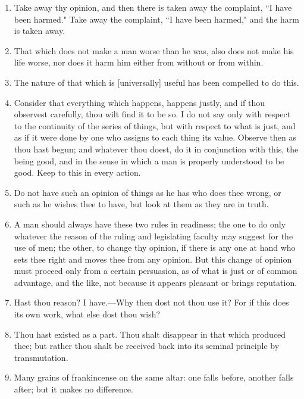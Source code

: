\begin{enumerate}
\item Take away thy opinion, and then there is taken away the complaint, ``I have been harmed." Take away the complaint, ``I have been harmed," and the harm is taken away.

\item That which does not make a man worse than he was, also does not make his life worse, nor does it harm him either from without or from within.

\item The nature of that which is [{\clarify universally}] useful has been compelled to do this.

\item Consider that everything which happens, happens justly, and if thou observest carefully, thou wilt find it to be so. I do not say only with respect to the continuity of the series of things, but with respect to what is just, and as if it were done by one who assigns to each thing its value. Observe then as thou hast begun; and whatever thou doest, do it in conjunction with this, the being good, and in the sense in which a man is properly understood to be good. Keep to this in every action.

\item Do not have such an opinion of things as he has who does thee wrong, or such as he wishes thee to have, but look at them as they are in truth.

\item A man should always have these two rules in readiness; the one to do only whatever the reason of the ruling and legislating faculty may suggest for the use of men; the other, to change thy opinion, if there is any one at hand who sets thee right and moves thee from any opinion. But this change of opinion must proceed only from a certain persuasion, as of what is just or of common advantage, and the like, not because it appears pleasant or brings reputation.

\item Hast thou reason? I have.—Why then dost not thou use it? For if this does its own work, what else dost thou wish?

\item Thou hast existed as a part. Thou shalt disappear in that which produced thee; but rather thou shalt be received back into its seminal principle by transmutation.

\item Many grains of frankincense on the same altar: one falls before, another falls after; but it makes no difference.


\end{enumerate}
